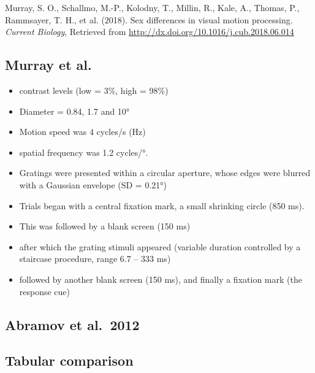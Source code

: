 \documentclass[]{article}
\providecommand{\tightlist}{%
  \setlength{\itemsep}{0pt}\setlength{\parskip}{0pt}}
\begin{document}
Murray, S. O., Schallmo, M.-P., Kolodny, T., Millin, R., Kale, A.,
Thomas, P., Rammsayer, T. H., et al. (2018). Sex differences in visual
motion processing. \emph{Current Biology}, Retrieved from
\url{http://dx.doi.org/10.1016/j.cub.2018.06.014}

\hypertarget{murray-et-al.-1}{%
\subsection{Murray et al.}\label{murray-et-al.-1}}

\begin{itemize}
\tightlist
\item
  contrast levels (low = 3\%, high = 98\%)
\item
  Diameter = 0.84, 1.7 and 10°
\item
  Motion speed was 4 cycles/s (Hz)
\item
  spatial frequency was 1.2 cycles/°.
\item
  Gratings were presented within a circular aperture, whose edges were
  blurred with a Gaussian envelope (SD = 0.21°)
\item
  Trials began with a central fixation mark, a small shrinking circle
  (850 ms).
\item
  This was followed by a blank screen (150 ms)
\item
  after which the grating stimuli appeared (variable duration controlled
  by a staircase procedure, range 6.7 -- 333 ms)
\item
  followed by another blank screen (150 ms), and finally a fixation mark
  (the response cue)
\end{itemize}

\hypertarget{abramov-et-al.2012}{%
\subsection{Abramov et al.~2012}\label{abramov-et-al.2012}}

\hypertarget{tabular-comparison}{%
\subsection{Tabular comparison}\label{tabular-comparison}}
\end{document}
